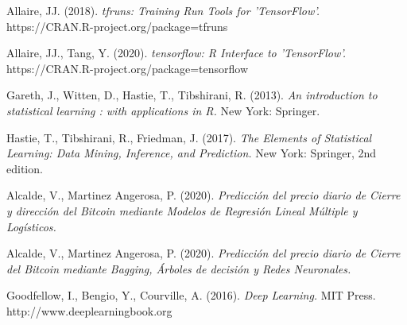 \documentclass[a4paper,12pt,twocolumn]{article}
\begin{document}
\begin{thebibliography}{99}
Allaire, JJ. (2018).
{\em tfruns: Training Run Tools for 'TensorFlow'.}
https://CRAN.R-project.org/package=tfruns

Allaire, JJ., Tang, Y. (2020).
{\em tensorflow: R Interface to 'TensorFlow'.}
https://CRAN.R-project.org/package=tensorflow

Gareth, J., Witten, D., Hastie, T., Tibshirani, R. (2013). 
{\em An introduction to statistical learning : with applications in R.}
New York: Springer.

Hastie, T., Tibshirani, R., Friedman, J. (2017). 
{\em The Elements of Statistical Learning: Data Mining, Inference, and Prediction.}
New York: Springer, 2nd edition.

Alcalde, V., Martinez Angerosa, P. (2020). 
{\em Predicción del precio diario de Cierre y dirección del Bitcoin mediante Modelos de Regresión Lineal Múltiple y Logísticos.}

Alcalde, V., Martinez Angerosa, P. (2020). 
{\em Predicción del precio diario de Cierre del
Bitcoin mediante Bagging, Árboles de
decisión y Redes Neuronales.}

Goodfellow, I., Bengio, Y., Courville, A. (2016). 
{\em Deep Learning.} MIT Press. 
http://www.deeplearningbook.org


\end{thebibliography}
\end{document}
